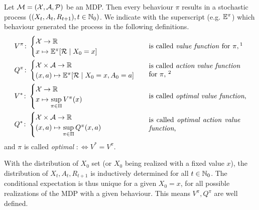 \begin{definition} Let \(\mathcal{M}=(\mathcal{X},\mathcal{A},\mathcal{P})\) be an MDP. Then every behaviour \(\pi\) results in a stochastic process \(((X_t,A_t,R_{t+1}), t\in \mathbb{N}_0)\).
We indicate with the superscript (e.g. \(\mathbb{E}^\pi\)) which behaviour generated the process in the following definitions.
\begin{align*}
	&V^\pi\colon
	\begin{cases}
		\cX\to\R\\
		x\mapsto \E^\pi[\cR\mid X_0=x]
	\end{cases} 
	&& \text{is called \emph{value function} for } \pi, \footnotemark[1]
	\\
	&Q^\pi\colon
	\begin{cases}
		\cX\times\cA\to\R\\
		(x,a)\mapsto \E^\pi[\cR\mid X_0=x, A_0=a]
	\end{cases}
	&& \parbox{13em}{is called \emph{action value function} for \(\pi\), \footnotemark[2]}
	\\
	&V^*\colon
	\begin{cases}
		\cX\to\R\\
		x\mapsto \sup\limits_{\pi\in\Pi} V^\pi(x)
	\end{cases} 
	&& \text{is called \emph{optimal value function},}
	\\
	&Q^*\colon
	\begin{cases}
		\cX\times\cA\to\R\\
		(x,a)\mapsto \sup\limits_{\pi\in\Pi} Q^\pi(x,a)
	\end{cases}
	&& \parbox{13em}{is called \emph{optimal action value function},}
\end{align*}
and \(\pi\) is called \emph{optimal} \(:\iff V^*=V^\pi\).
\end{definition}

\begin{remark}
With the distribution of \(X_0\) set (or \(X_0\) being realized with a fixed value \(x\)), the distribution of \(X_t, A_t,R_{t+1}\) is inductively determined for all \(t\in\mathbb{N}_0\). The conditional expectation is thus unique for a given \(X_0=x\), for all possible realizations of the MDP with a given behaviour.
This means \(V^\pi, Q^\pi\) are well defined.
\end{remark}

